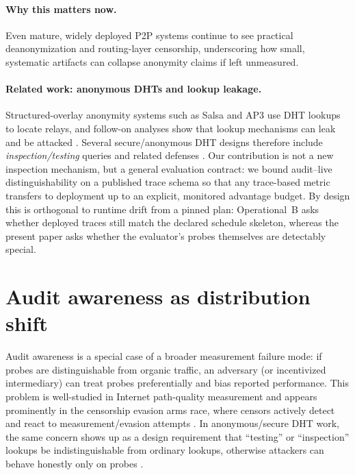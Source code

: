 \documentclass[11pt]{article}
\begin{document}
\paragraph{Why this matters now.}
Even mature, widely deployed P2P systems continue to see practical deanonymization and routing-layer censorship, underscoring how small, systematic artifacts can collapse anonymity claims if left unmeasured.\cite{heimbach2025_eth_validators,sridhar2024ipfs_censorship}
\paragraph{Related work: anonymous DHTs and lookup leakage.}
Structured-overlay anonymity systems such as Salsa \cite{salsa2006} and AP3 \cite{ap32004} use DHT lookups to locate relays, and follow-on analyses show that lookup mechanisms can leak and be attacked \cite{wangmittalborisov2010,mittalborisov2012}.
Several secure/anonymous DHT designs therefore include \emph{inspection/testing} queries and related defenses \cite{octopus2012,ipersea2014}.
Our contribution is not a new inspection mechanism, but a general evaluation contract: we bound audit--live distinguishability on a published trace schema so that any trace-based metric transfers to deployment up to an explicit, monitored advantage budget.
By design this is orthogonal to runtime drift from a pinned plan: Operational~B asks whether deployed traces still match the declared schedule skeleton, whereas the present paper asks whether the evaluator's probes themselves are detectably special.

\section{Audit awareness as distribution shift}

Audit awareness is a special case of a broader measurement failure mode: if probes are distinguishable from organic traffic,
an adversary (or incentivized intermediary) can treat probes preferentially and bias reported performance.
This problem is well-studied in Internet path-quality measurement \cite{goldberg2008pqm,tariq2009nano} and appears prominently in the censorship evasion arms race,
where censors actively detect and react to measurement/evasion attempts \cite{deresistor2023}.
In anonymous/secure DHT work, the same concern shows up as a design requirement that ``testing'' or ``inspection'' lookups be indistinguishable from ordinary lookups,
otherwise attackers can behave honestly only on probes \cite{octopus2012,ipersea2014,wangmittalborisov2010}.
\end{document}
